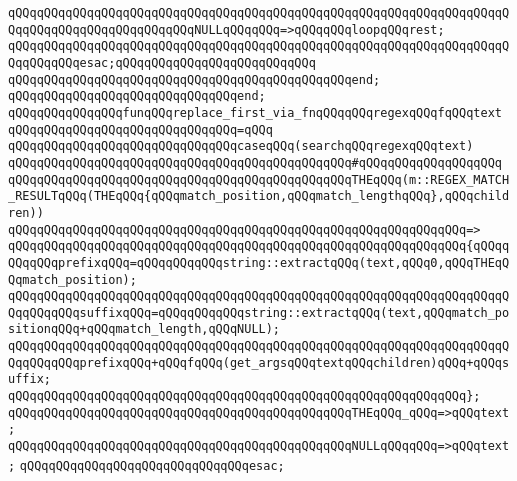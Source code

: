 \verb|qQQqqQQqqQQqqQQqqQQqqQQqqQQqqQQqqQQqqQQqqQQqqQQqqQQqqQQqqQQqqQQqqQQqqQQqqQQqqQQqqQQqqQQqqQQqqQQqNULLqQQqqQQq=>qQQqqQQqloopqQQqrest;|\newline
\verb|qQQqqQQqqQQqqQQqqQQqqQQqqQQqqQQqqQQqqQQqqQQqqQQqqQQqqQQqqQQqqQQqqQQqqQQqqQQqqQQqesac;qQQqqQQqqQQqqQQqqQQqqQQqqQQq|\newline
\verb|qQQqqQQqqQQqqQQqqQQqqQQqqQQqqQQqqQQqqQQqqQQqqQQqend;|\newline
\verb|qQQqqQQqqQQqqQQqqQQqqQQqqQQqqQQqend;|\newline
\newline
\newline
\verb|qQQqqQQqqQQqqQQqfunqQQqreplace_first_via_fnqQQqqQQqregexqQQqfqQQqtext|\newline
\verb|qQQqqQQqqQQqqQQqqQQqqQQqqQQqqQQq=qQQq|\newline
\verb|qQQqqQQqqQQqqQQqqQQqqQQqqQQqqQQqcaseqQQq(searchqQQqregexqQQqtext)|\newline
\verb|qQQqqQQqqQQqqQQqqQQqqQQqqQQqqQQqqQQqqQQqqQQqqQQq#qQQqqQQqqQQqqQQqqQQq|\newline
\verb|qQQqqQQqqQQqqQQqqQQqqQQqqQQqqQQqqQQqqQQqqQQqqQQqTHEqQQq(m::REGEX_MATCH_RESULTqQQq(THEqQQq{qQQqmatch_position,qQQqmatch_lengthqQQq},qQQqchildren))|\newline
\verb|qQQqqQQqqQQqqQQqqQQqqQQqqQQqqQQqqQQqqQQqqQQqqQQqqQQqqQQqqQQqqQQq=>|\newline
\verb|qQQqqQQqqQQqqQQqqQQqqQQqqQQqqQQqqQQqqQQqqQQqqQQqqQQqqQQqqQQqqQQq{qQQqqQQqqQQqprefixqQQq=qQQqqQQqqQQqstring::extractqQQq(text,qQQq0,qQQqTHEqQQqmatch_position);|\newline
\verb|qQQqqQQqqQQqqQQqqQQqqQQqqQQqqQQqqQQqqQQqqQQqqQQqqQQqqQQqqQQqqQQqqQQqqQQqqQQqqQQqsuffixqQQq=qQQqqQQqqQQqstring::extractqQQq(text,qQQqmatch_positionqQQq+qQQqmatch_length,qQQqNULL);|\newline
\verb|qQQqqQQqqQQqqQQqqQQqqQQqqQQqqQQqqQQqqQQqqQQqqQQqqQQqqQQqqQQqqQQqqQQqqQQqqQQqqQQqprefixqQQq+qQQqfqQQq(get_argsqQQqtextqQQqchildren)qQQq+qQQqsuffix;|\newline
\verb|qQQqqQQqqQQqqQQqqQQqqQQqqQQqqQQqqQQqqQQqqQQqqQQqqQQqqQQqqQQqqQQq};|\newline
\newline
\verb|qQQqqQQqqQQqqQQqqQQqqQQqqQQqqQQqqQQqqQQqqQQqqQQqTHEqQQq_qQQq=>qQQqtext;|\newline
\verb|qQQqqQQqqQQqqQQqqQQqqQQqqQQqqQQqqQQqqQQqqQQqqQQqNULLqQQqqQQq=>qQQqtext;|\newline
\verb|qQQqqQQqqQQqqQQqqQQqqQQqqQQqqQQqesac;|\newline
